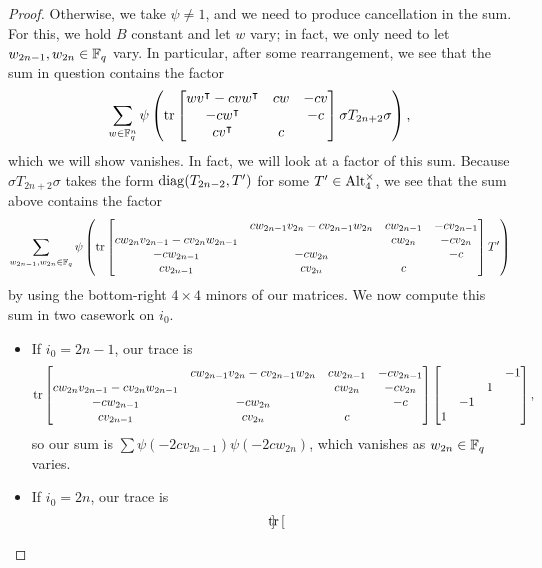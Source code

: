 \begin{proof}
    Otherwise, we take $\psi\ne1$, and we need to produce cancellation in the sum. For this, we hold $B$ constant and let $w$ vary; in fact, we only need to let $w_{2n-1},w_{2n}\in\mathbb F_q$ vary. In particular, after some rearrangement, we see that the sum in question contains the factor
    \[\sum_{w\in\mathbb F_q^n}\psi\left(\operatorname{tr}\begin{bmatrix}
        wv^\intercal-cvw^\intercal & cw & -cv \\
        -cw^\intercal && -c \\
        cv^\intercal & c
    \end{bmatrix}\sigma T_{2n+2}\sigma\right),\]
    which we will show vanishes. In fact, we will look at a factor of this sum. Because $\sigma T_{2n+2}\sigma$ takes the form $\operatorname{diag}(T_{2n-2},T')$ for some $T'\in\operatorname{Alt}_4^\times$, we see that the sum above contains the factor
    \[\sum_{w_{2n-1},w_{2n}\in\mathbb F_q}\psi\left(\operatorname{tr}\begin{bmatrix}
        & cw_{2n-1}v_{2n}-cv_{2n-1}w_{2n} & cw_{2n-1} & -cv_{2n-1} \\
        cw_{2n}v_{2n-1}-cv_{2n}w_{2n-1} & & cw_{2n} & -cv_{2n} \\
        -cw_{2n-1} & -cw_{2n} & & -c \\
        cv_{2n-1} & cv_{2n} & c
    \end{bmatrix}T'\right)\]
    by using the bottom-right $4\times4$ minors of our matrices. We now compute this sum in two casework on $i_0$.
    \begin{itemize}
        \item If $i_0=2n-1$, our trace is
        \[\operatorname{tr}\begin{bmatrix}
            & cw_{2n-1}v_{2n}-cv_{2n-1}w_{2n} & cw_{2n-1} & -cv_{2n-1} \\
            cw_{2n}v_{2n-1}-cv_{2n}w_{2n-1} & & cw_{2n} & -cv_{2n} \\
            -cw_{2n-1} & -cw_{2n} & & -c \\
            cv_{2n-1} & cv_{2n} & c
        \end{bmatrix}\begin{bmatrix}
            &&& -1 \\ && 1 \\ & -1 \\ 1
        \end{bmatrix},\]
        so our sum is $\sum\psi(-2cv_{2n-1})\psi(-2cw_{2n})$, which vanishes as $w_{2n}\in\mathbb F_q$ varies.
        \item If $i_0=2n$, our trace is
        \[\operatorname{tr}\begin{bmatrix}

\end{bmatrix}\]
\end{itemize}
\end{proof}
